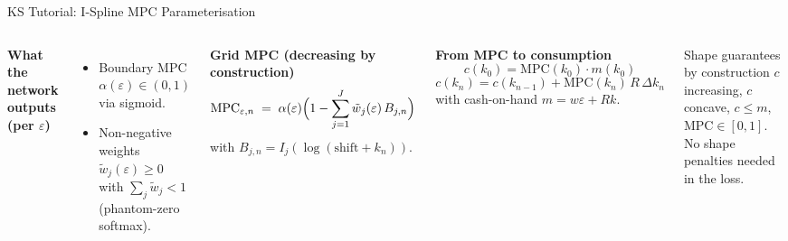 \documentclass[aspectratio=169,11pt]{beamer}
\begin{document}
\begin{frame}{KS Tutorial: I-Spline MPC Parameterisation}
\small
\begin{columns}[T]
\textbf{What the network outputs (per $\varepsilon$)}
\begin{itemize}\itemsep2pt
    \item Boundary MPC $\alpha(\varepsilon)\in(0,1)$ via sigmoid.
    \item Non-negative weights $\tilde w_j(\varepsilon)\ge 0$ with $\sum_j \tilde w_j < 1$ (phantom-zero softmax).
\end{itemize}

\textbf{Grid MPC (decreasing by construction)}
\[
\mathrm{MPC}_{\varepsilon,n} \;=\; \alpha(\varepsilon)\Bigl(1 - \sum_{j=1}^{J}\tilde w_j(\varepsilon)\, B_{j,n}\Bigr)
\]
with $B_{j,n}=I_j(\log(\text{shift}+k_n))$.

\textbf{From MPC to consumption}
\[
c(k_0)=\mathrm{MPC}(k_0)\cdot m(k_0)
\]
\[
c(k_n)=c(k_{n-1})+\mathrm{MPC}(k_n)\,R\,\Delta k_n
\]
with cash-on-hand $m=w\varepsilon+Rk$.

\medskip
\begin{block}{Shape guarantees by construction}
$c$ increasing, $c$ concave, $c\le m$, $\mathrm{MPC}\in[0,1]$.  No shape penalties needed in the loss.
\end{block}
\end{columns}
\end{frame}
\end{document}
